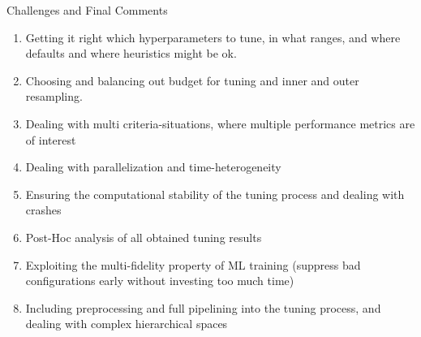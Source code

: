 \begin{frame}[allowframebreaks]{Challenges and Final Comments}
\begin{enumerate}
  \item Getting it right which hyperparameters to tune, in what ranges, and where defaults and where heuristics might be ok.
  \item Choosing and balancing out budget for tuning and inner and outer resampling.
  \item Dealing with multi criteria-situations, where multiple performance metrics are of interest
  \item Dealing with parallelization and time-heterogeneity    
  \item Ensuring the computational stability of the tuning process and dealing with crashes
    
  \framebreak    

  \item Post-Hoc analysis of all obtained tuning results
  \item Exploiting the multi-fidelity property of ML training (suppress bad configurations early without investing too much time)
  \item Including preprocessing and full pipelining into the tuning process, and dealing with complex hierarchical spaces
 \end{enumerate}

\end{frame}



